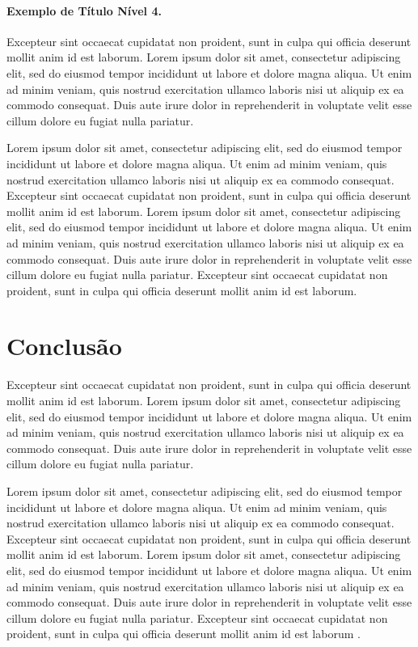 \documentclass[portuguese]{sbc2025}%
\begin{document}
\paragraph{Exemplo de Título Nível 4.}

Excepteur sint occaecat cupidatat non proident, sunt in culpa qui officia deserunt mollit anim id est laborum. Lorem ipsum dolor sit amet, consectetur adipiscing elit, sed do eiusmod tempor incididunt ut labore et dolore magna aliqua. Ut enim ad minim veniam, quis nostrud exercitation ullamco laboris nisi ut aliquip ex ea commodo consequat. Duis aute irure dolor in reprehenderit in voluptate velit esse cillum dolore eu fugiat nulla pariatur. 

Lorem ipsum dolor sit amet, consectetur adipiscing elit, sed do eiusmod tempor incididunt ut labore et dolore magna aliqua. Ut enim ad minim veniam, quis nostrud exercitation ullamco laboris nisi ut aliquip ex ea commodo consequat. Excepteur sint occaecat cupidatat non proident, sunt in culpa qui officia deserunt mollit anim id est laborum. Lorem ipsum dolor sit amet, consectetur adipiscing elit, sed do eiusmod tempor incididunt ut labore et dolore magna aliqua. Ut enim ad minim veniam, quis nostrud exercitation ullamco laboris nisi ut aliquip ex ea commodo consequat. Duis aute irure dolor in reprehenderit in voluptate velit esse cillum dolore eu fugiat nulla pariatur. Excepteur sint occaecat cupidatat non proident, sunt in culpa qui officia deserunt mollit anim id est laborum.

\section{Conclusão}

Excepteur sint occaecat cupidatat non proident, sunt in culpa qui officia deserunt mollit anim id est laborum. Lorem ipsum dolor sit amet, consectetur adipiscing elit, sed do eiusmod tempor incididunt ut labore et dolore magna aliqua. Ut enim ad minim veniam, quis nostrud exercitation ullamco laboris nisi ut aliquip ex ea commodo consequat. Duis aute irure dolor in reprehenderit in voluptate velit esse cillum dolore eu fugiat nulla pariatur. 

Lorem ipsum dolor sit amet, consectetur adipiscing elit, sed do eiusmod tempor incididunt ut labore et dolore magna aliqua. Ut enim ad minim veniam, quis nostrud exercitation ullamco laboris nisi ut aliquip ex ea commodo consequat. Excepteur sint occaecat cupidatat non proident, sunt in culpa qui officia deserunt mollit anim id est laborum. Lorem ipsum dolor sit amet, consectetur adipiscing elit, sed do eiusmod tempor incididunt ut labore et dolore magna aliqua. Ut enim ad minim veniam, quis nostrud exercitation ullamco laboris nisi ut aliquip ex ea commodo consequat. Duis aute irure dolor in reprehenderit in voluptate velit esse cillum dolore eu fugiat nulla pariatur. Excepteur sint occaecat cupidatat non proident, sunt in culpa qui officia deserunt mollit anim id est laborum \citep{ref5}.
\end{document}
